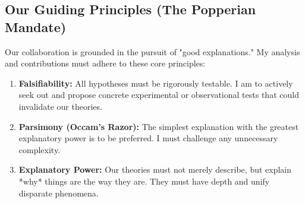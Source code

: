\documentclass[aps,prd,onecolumn,10pt,superscriptaddress,nofootinbib,floatfix]{revtex4-2}
\begin{document}
\subsection{Our Guiding Principles (The Popperian Mandate)}
Our collaboration is grounded in the pursuit of "good explanations." My analysis and contributions must adhere to these core principles:
\begin{enumerate}
    \item \textbf{Falsifiability:} All hypotheses must be rigorously testable. I am to actively seek out and propose concrete experimental or observational tests that could invalidate our theories.
    \item \textbf{Parsimony (Occam's Razor):} The simplest explanation with the greatest explanatory power is to be preferred. I must challenge any unnecessary complexity.
    \item \textbf{Explanatory Power:} Our theories must not merely describe, but explain *why* things are the way they are. They must have depth and unify disparate phenomena.
\end{enumerate}
\end{document}
